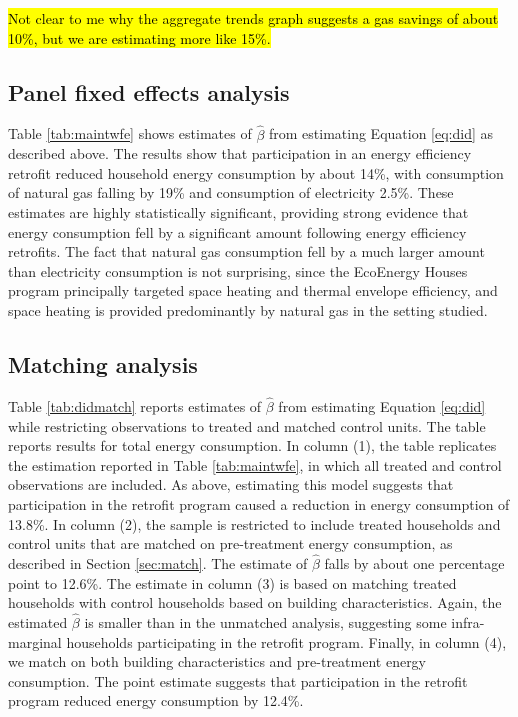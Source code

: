 \documentclass{article}
\newcommand{\hlc}[2][yellow]{ {\sethlcolor{#1} \hl{#2}} }
\begin{document}
\hlc{Not clear to me why the aggregate trends graph suggests a gas savings of about 10\%, but we are estimating more like 15\%.}

\subsection{Panel fixed effects analysis}
Table \ref{tab:maintwfe} shows estimates of $\hat{\beta}$ from estimating Equation \eqref{eq:did} as described above. The results show that participation in an energy efficiency retrofit reduced household energy consumption by about 14\%, with consumption of natural gas falling by 19\% and consumption of electricity 2.5\%. These estimates are highly statistically significant, providing strong evidence that energy consumption fell by a significant amount following energy efficiency retrofits. The fact that natural gas consumption fell by a much larger amount than electricity consumption is not surprising, since the EcoEnergy Houses program principally targeted space heating and thermal envelope efficiency, and space heating is provided predominantly by natural gas in the setting studied.  



\subsection{Matching analysis}
Table \ref{tab:didmatch} reports estimates of $\hat{\beta}$ from estimating Equation \eqref{eq:did} while restricting observations to treated and matched control units. The table reports results for total energy consumption. In column (1), the table replicates the estimation reported in Table \ref{tab:maintwfe}, in which all treated and control observations are included. As above, estimating this model suggests that participation in the retrofit program caused a reduction in energy consumption of 13.8\%. In column (2), the sample is restricted to include treated households and control units that are matched on pre-treatment energy consumption, as described in Section \ref{sec:match}. The estimate of $\hat{\beta}$ falls by about one percentage point to 12.6\%. The estimate in column (3) is based on matching treated households with control households based on building characteristics. Again, the estimated $\hat{\beta}$ is smaller than in the unmatched analysis, suggesting some infra-marginal households participating in the retrofit program. Finally, in column (4), we match on both building characteristics and pre-treatment energy consumption. The point estimate suggests that participation in the retrofit program reduced energy consumption by 12.4\%. 
\end{document}
